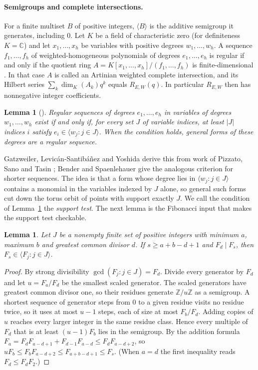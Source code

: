 \documentclass[11pt,a4paper]{article}
\newtheorem{lemma}[theorem]{Lemma}
\theoremstyle{definition}\newtheorem{definition}[theorem]{Definition}
\theoremstyle{remark}\newtheorem{remark}[theorem]{Remark}\newtheorem{example}[theorem]{Example}
\numberwithin{equation}{section}
\begin{document}
\paragraph{Semigroups and complete intersections.}
For a finite multiset $B$ of positive integers, $\langle B\rangle$ is the additive semigroup it generates, including $0$. Let $K$ be a field of characteristic zero (for definiteness $K=\mathbb C$) and let $x_1,\ldots,x_h$ be variables with positive degrees $w_1,\ldots,w_h$. A sequence $f_1,\ldots,f_h$ of weighted-homogeneous polynomials of degrees $e_1,\ldots,e_h$ is regular if and only if the quotient ring $A=K[x_1,\ldots,x_h]/(f_1,\ldots,f_h)$ is finite-dimensional \cite[Lemma~52]{billey}. In that case $A$ is called an Artinian weighted complete intersection, and its Hilbert series $\sum_k\dim_K(A_k)q^k$ equals $R_{E,W}(q)$. In particular $R_{E,W}$ then has nonnegative integer coefficients.

\begin{lemma}[{\cite[Prop.~3.3]{gly}}]\label{lem:ci}
Regular sequences of degrees $e_1,\ldots,e_h$ in variables of degrees $w_1,\ldots,w_h$ exist if and only if, for every set $J$ of variable indices, at least $|J|$ indices $i$ satisfy $e_i\in\langle w_j:j\in J\rangle$. When the condition holds, general forms of these degrees are a regular sequence.
\end{lemma}
Gatzweiler, Levic\'an-Santib\'a\~nez and Yoshida derive this from work of Pizzato, Sano and Tasin \cite{gly}; Bender and Spaenlehauer \cite[Thm.~3.8]{bs} give the analogous criterion for shorter sequences. The idea is that a form whose degree lies in $\langle w_j:j\in J\rangle$ contains a monomial in the variables indexed by $J$ alone, so general such forms cut down the torus orbit of points with support exactly $J$. We call the condition of Lemma~\ref{lem:ci} the \emph{support test}. The next lemma is the Fibonacci input that makes the support test checkable.

\begin{lemma}\label{lem:conductor}
Let $J$ be a nonempty finite set of positive integers with minimum $a$, maximum $b$ and greatest common divisor $d$. If $s\ge a+b-d+1$ and $F_d\mid F_s$, then $F_s\in\langle F_j:j\in J\rangle$.
\end{lemma}
\begin{proof}
By strong divisibility $\gcd(F_j:j\in J)=F_d$. Divide every generator by $F_d$ and let $u=F_a/F_d$ be the smallest scaled generator. The scaled generators have greatest common divisor one, so their residues generate $\mathbb Z/u\mathbb Z$ as a semigroup. A shortest sequence of generator steps from $0$ to a given residue visits no residue twice, so it uses at most $u-1$ steps, each of size at most $F_b/F_d$. Adding copies of $u$ reaches every larger integer in the same residue class. Hence every multiple of $F_d$ that is at least $(u-1)F_b$ lies in the semigroup. By the addition formula $F_a=F_dF_{a-d+1}+F_{d-1}F_{a-d}\le F_dF_{a-d+2}$, so $uF_b\le F_bF_{a-d+2}\le F_{a+b-d+1}\le F_s$. (When $a=d$ the first inequality reads $F_d\le F_dF_2$.)
\end{proof}
\end{document}
